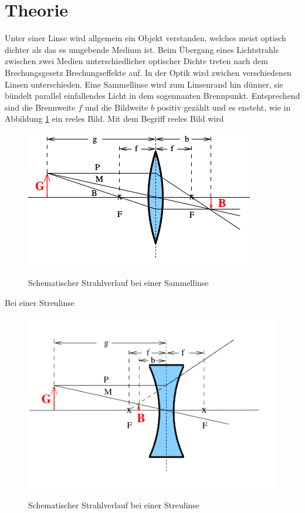 \section{Theorie}
\label{sec:Theorie}
Unter einer Linse wird allgemein ein Objekt verstanden, welches meist optisch dichter als das es umgebende Medium ist.
Beim Übergang eines Lichtstrahls zwischen zwei Medien unterschiedlicher optischer Dichte treten nach dem Brechungsgesetz Brechungseffekte auf.
In der Optik wird zwichen verschiedenen Linsen unterschieden.
Eine Sammellinse wird zum Linsenrand hin dünner, sie bündelt parallel einfallendes Licht in dem sogennanten Brennpunkt. Entsprechend sind die Brennweite $f$ und die Bildweite $b$ positiv gezählt und es ensteht, wie in Abbildung \ref{fig:sammelli} ein reeles Bild. Mit dem Begriff reeles Bild wird
\begin{figure}
  \caption{Schematischer Strahlverlauf bei einer Sammellinse \cite{Anleitung}}
  \includegraphics{Bilder/sammellinse.png}
  \label{fig:sammelli}
\end{figure}
Bei einer Streulinse
\begin{figure}
  \caption{Schematischer Strahlverlauf bei einer Streulinse \cite{Anleitung}}
  \includegraphics{Bilder/streulinse.png}
  \label{fig:streuli}
\end{figure}


